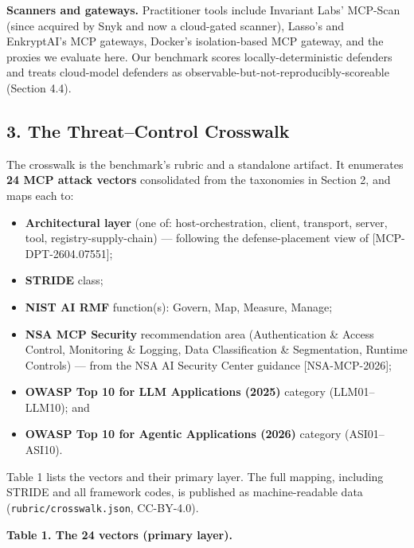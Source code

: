 \documentclass[
]{article}
\providecommand{\tightlist}{%
  \setlength{\itemsep}{0pt}\setlength{\parskip}{0pt}}
\begin{document}
\textbf{Scanners and gateways.} Practitioner tools include Invariant
Labs' MCP-Scan (since acquired by Snyk and now a cloud-gated scanner),
Lasso's and EnkryptAI's MCP gateways, Docker's isolation-based MCP
gateway, and the proxies we evaluate here. Our benchmark scores
locally-deterministic defenders and treats cloud-model defenders as
observable-but-not-reproducibly-scoreable (Section 4.4).

\subsection{3. The Threat--Control
Crosswalk}\label{the-threatcontrol-crosswalk}

The crosswalk is the benchmark's rubric and a standalone artifact. It
enumerates \textbf{24 MCP attack vectors} consolidated from the
taxonomies in Section 2, and maps each to:

\begin{itemize}
\tightlist
\item
  \textbf{Architectural layer} (one of: host-orchestration, client,
  transport, server, tool, registry-supply-chain) --- following the
  defense-placement view of {[}MCP-DPT-2604.07551{]};
\item
  \textbf{STRIDE} class;
\item
  \textbf{NIST AI RMF} function(s): Govern, Map, Measure, Manage;
\item
  \textbf{NSA MCP Security} recommendation area (Authentication \&
  Access Control, Monitoring \& Logging, Data Classification \&
  Segmentation, Runtime Controls) --- from the NSA AI Security Center
  guidance {[}NSA-MCP-2026{]};
\item
  \textbf{OWASP Top 10 for LLM Applications (2025)} category
  (LLM01--LLM10); and
\item
  \textbf{OWASP Top 10 for Agentic Applications (2026)} category
  (ASI01--ASI10).
\end{itemize}

Table 1 lists the vectors and their primary layer. The full mapping,
including STRIDE and all framework codes, is published as
machine-readable data (\texttt{rubric/crosswalk.json}, CC-BY-4.0).

\textbf{Table 1. The 24 vectors (primary layer).}
\end{document}
